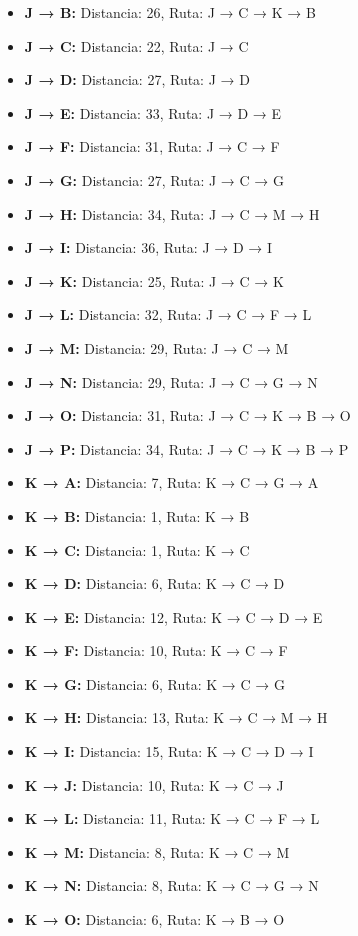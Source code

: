 \documentclass[12pt]{article}
\begin{document}
\begin{itemize}
\item \textbf{J → B:} Distancia: 26, Ruta: J → C → K → B
\item \textbf{J → C:} Distancia: 22, Ruta: J → C
\item \textbf{J → D:} Distancia: 27, Ruta: J → D
\item \textbf{J → E:} Distancia: 33, Ruta: J → D → E
\item \textbf{J → F:} Distancia: 31, Ruta: J → C → F
\item \textbf{J → G:} Distancia: 27, Ruta: J → C → G
\item \textbf{J → H:} Distancia: 34, Ruta: J → C → M → H
\item \textbf{J → I:} Distancia: 36, Ruta: J → D → I
\item \textbf{J → K:} Distancia: 25, Ruta: J → C → K
\item \textbf{J → L:} Distancia: 32, Ruta: J → C → F → L
\item \textbf{J → M:} Distancia: 29, Ruta: J → C → M
\item \textbf{J → N:} Distancia: 29, Ruta: J → C → G → N
\item \textbf{J → O:} Distancia: 31, Ruta: J → C → K → B → O
\item \textbf{J → P:} Distancia: 34, Ruta: J → C → K → B → P
\item \textbf{K → A:} Distancia: 7, Ruta: K → C → G → A
\item \textbf{K → B:} Distancia: 1, Ruta: K → B
\item \textbf{K → C:} Distancia: 1, Ruta: K → C
\item \textbf{K → D:} Distancia: 6, Ruta: K → C → D
\item \textbf{K → E:} Distancia: 12, Ruta: K → C → D → E
\item \textbf{K → F:} Distancia: 10, Ruta: K → C → F
\item \textbf{K → G:} Distancia: 6, Ruta: K → C → G
\item \textbf{K → H:} Distancia: 13, Ruta: K → C → M → H
\item \textbf{K → I:} Distancia: 15, Ruta: K → C → D → I
\item \textbf{K → J:} Distancia: 10, Ruta: K → C → J
\item \textbf{K → L:} Distancia: 11, Ruta: K → C → F → L
\item \textbf{K → M:} Distancia: 8, Ruta: K → C → M
\item \textbf{K → N:} Distancia: 8, Ruta: K → C → G → N
\item \textbf{K → O:} Distancia: 6, Ruta: K → B → O

\end{itemize}
\end{document}
